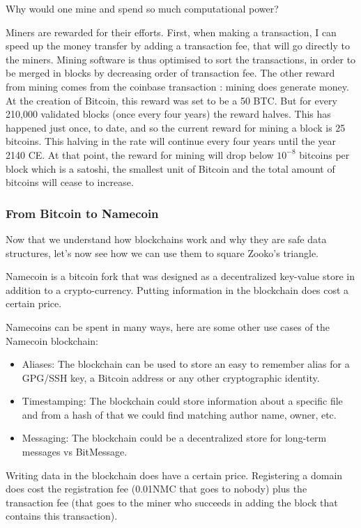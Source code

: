 \documentclass{vldb}
\begin{document}
Why would one mine and spend so much computational power?


Miners are rewarded for their efforts. First, when making a transaction, I can speed up the money transfer by adding a transaction fee, that will go directly to the miners. Mining software is thus optimised to sort the transactions, in order to be merged in blocks by decreasing order of transaction fee. 
The other reward from mining comes from the coinbase transaction : mining does generate money.  At the creation of Bitcoin, this reward was set to be a 50 BTC. But for every 210,000 validated blocks (once every four years) the reward halves. This has happened just once, to date, and so the current reward for mining a block is 25 bitcoins. This halving in the rate will continue every four years until the year 2140 CE. At that point, the reward for mining will drop below $10^{-8}$ bitcoins per block which is a satoshi, the smallest unit of Bitcoin and the total amount of bitcoins will cease to increase.

\subsubsection{From Bitcoin to Namecoin}

Now that we understand how blockchains work and why they are safe data structures, let's now see how we can use them to square Zooko's triangle. 

Namecoin is a bitcoin fork that was designed as a decentralized key-value store in addition to a crypto-currency. Putting information in the blockchain does cost a certain price.

Namecoins can be spent in many ways, here are some other use cases of the Namecoin blockchain:
\begin{itemize}
\item Aliases: The blockchain can be used to store an easy to remember alias for a GPG/SSH key, a Bitcoin address or any other cryptographic identity.
\item Timestamping: The blockchain could store information about a specific file and from a hash of that we could find matching author name, owner, etc.
\item Messaging: The blockchain could be a decentralized store for  long-term messages vs BitMessage.
\end{itemize}

Writing data in the blockchain does have a certain price. Registering a domain does cost the registration fee (0.01NMC that goes to nobody) plus the transaction fee (that goes to the miner who succeeds in adding the block that contains this transaction).
\end{document}
